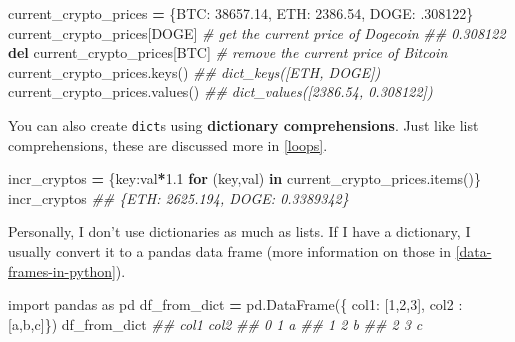 \documentclass[
  12pt,
  krantz2]{krantz}
\makeatletter
\newenvironment{Shaded}{\begin{snugshade}}{\end{snugshade}}
\newcommand{\CommentTok}[1]{\textcolor[rgb]{0.37,0.37,0.37}{\textit{#1}}}
\newcommand{\ControlFlowTok}[1]{\textcolor[rgb]{0.27,0.27,0.27}{\textbf{#1}}}
\newcommand{\DecValTok}[1]{\textcolor[rgb]{0.06,0.06,0.06}{#1}}
\newcommand{\FloatTok}[1]{\textcolor[rgb]{0.06,0.06,0.06}{#1}}
\newcommand{\ImportTok}[1]{#1}
\newcommand{\KeywordTok}[1]{\textcolor[rgb]{0.27,0.27,0.27}{\textbf{#1}}}
\newcommand{\NormalTok}[1]{#1}
\newcommand{\OperatorTok}[1]{\textcolor[rgb]{0.43,0.43,0.43}{\textbf{#1}}}
\newcommand{\StringTok}[1]{\textcolor[rgb]{0.5,0.5,0.5}{#1}}
\newenvironment{kframe}{%
\medskip{}
\setlength{\fboxsep}{.8em}
 \def\at@end@of@kframe{}%
 \ifinner\ifhmode%
  \def\at@end@of@kframe{\end{minipage}}%
  \begin{minipage}{\columnwidth}%
 \fi\fi%
 \def\FrameCommand##1{\hskip\@totalleftmargin \hskip-\fboxsep
 \colorbox{shadecolor}{##1}\hskip-\fboxsep
     \hskip-\linewidth \hskip-\@totalleftmargin \hskip\columnwidth}%
 \MakeFramed {\advance\hsize-\width
   \@totalleftmargin\z@ \linewidth\hsize
   \@setminipage}}%
 {\par\unskip\endMakeFramed%
 \at@end@of@kframe}
\renewenvironment{Shaded}{\begin{kframe}}{\end{kframe}}
\makeatother
\begin{document}
\begin{Shaded}
\begin{Highlighting}[]
\NormalTok{current\_crypto\_prices }\OperatorTok{=}\NormalTok{ \{}\StringTok{\textquotesingle{}BTC\textquotesingle{}}\NormalTok{: }\FloatTok{38657.14}\NormalTok{, }\StringTok{\textquotesingle{}ETH\textquotesingle{}}\NormalTok{: }\FloatTok{2386.54}\NormalTok{, }\StringTok{\textquotesingle{}DOGE\textquotesingle{}}\NormalTok{: }\FloatTok{.308122}\NormalTok{\}}
\NormalTok{current\_crypto\_prices[}\StringTok{\textquotesingle{}DOGE\textquotesingle{}}\NormalTok{] }\CommentTok{\# get the current price of Dogecoin}
\CommentTok{\#\# 0.308122}
\KeywordTok{del}\NormalTok{ current\_crypto\_prices[}\StringTok{\textquotesingle{}BTC\textquotesingle{}}\NormalTok{] }\CommentTok{\# remove the current price of Bitcoin}
\NormalTok{current\_crypto\_prices.keys()}
\CommentTok{\#\# dict\_keys([\textquotesingle{}ETH\textquotesingle{}, \textquotesingle{}DOGE\textquotesingle{}])}
\NormalTok{current\_crypto\_prices.values()}
\CommentTok{\#\# dict\_values([2386.54, 0.308122])}
\end{Highlighting}
\end{Shaded}

You can also create \texttt{dict}s using \textbf{dictionary comprehensions}. Just like list comprehensions, these are discussed more in \ref{loops}.

\begin{Shaded}
\begin{Highlighting}[]
\NormalTok{incr\_cryptos }\OperatorTok{=}\NormalTok{ \{key:val}\OperatorTok{*}\FloatTok{1.1} \ControlFlowTok{for}\NormalTok{ (key,val) }\KeywordTok{in}\NormalTok{ current\_crypto\_prices.items()\}}
\NormalTok{incr\_cryptos}
\CommentTok{\#\# \{\textquotesingle{}ETH\textquotesingle{}: 2625.194, \textquotesingle{}DOGE\textquotesingle{}: 0.3389342\}}
\end{Highlighting}
\end{Shaded}

Personally, I don't use dictionaries as much as lists. If I have a dictionary, I usually convert it to a pandas data frame (more information on those in \ref{data-frames-in-python}).

\begin{Shaded}
\begin{Highlighting}[]
\ImportTok{import}\NormalTok{ pandas }\ImportTok{as}\NormalTok{ pd}
\NormalTok{df\_from\_dict }\OperatorTok{=}\NormalTok{ pd.DataFrame(\{ }\StringTok{\textquotesingle{}col1\textquotesingle{}}\NormalTok{: [}\DecValTok{1}\NormalTok{,}\DecValTok{2}\NormalTok{,}\DecValTok{3}\NormalTok{], }\StringTok{\textquotesingle{}col2\textquotesingle{}}\NormalTok{ : [}\StringTok{\textquotesingle{}a\textquotesingle{}}\NormalTok{,}\StringTok{\textquotesingle{}b\textquotesingle{}}\NormalTok{,}\StringTok{\textquotesingle{}c\textquotesingle{}}\NormalTok{]\})}
\NormalTok{df\_from\_dict}
\CommentTok{\#\#    col1 col2}
\CommentTok{\#\# 0     1    a}
\CommentTok{\#\# 1     2    b}
\CommentTok{\#\# 2     3    c}
\end{Highlighting}
\end{Shaded}
\end{document}

